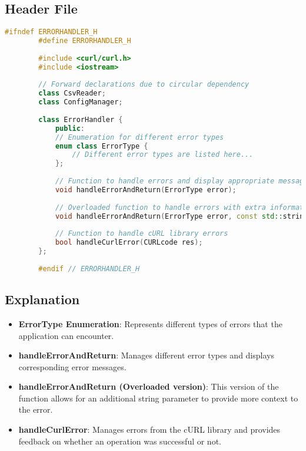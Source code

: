 \documentclass{article}
\begin{document}
	\subsection*{Header File}
	\begin{mdframed}[backgroundcolor=background, hidealllines=false, innerleftmargin=15pt, innerrightmargin=5pt, innertopmargin=0pt, innerbottommargin=-5pt]
	\begin{lstlisting}[language=C++]
		#ifndef ERRORHANDLER_H
		#define ERRORHANDLER_H
		
		#include <curl/curl.h>
		#include <iostream>
		
		// Forward declarations due to circular dependency
		class CsvReader; 
		class ConfigManager; 
		
		class ErrorHandler {
			public:
			// Enumeration for different error types
			enum class ErrorType {
				// Different error types are listed here...
			};
			
			// Function to handle errors and display appropriate messages
			void handleErrorAndReturn(ErrorType error);
			
			// Overloaded function to handle errors with extra information
			void handleErrorAndReturn(ErrorType error, const std::string& extraInfo);
			
			// Function to handle cURL library errors
			bool handleCurlError(CURLcode res);
		};
		
		#endif // ERRORHANDLER_H
	\end{lstlisting}
\end{mdframed}
	
	\subsection*{Explanation}
	\begin{itemize}
		\item \textbf{ErrorType Enumeration}: Represents different types of errors that the application can encounter.
		\item \textbf{handleErrorAndReturn}: Manages different error types and displays corresponding error messages.
		\item \textbf{handleErrorAndReturn (Overloaded version)}: This version of the function allows for an additional string parameter to provide more context to the error.
		\item \textbf{handleCurlError}: Manages errors from the cURL library and provides feedback on whether an operation was successful or not.
	\end{itemize}
	
\end{document}
